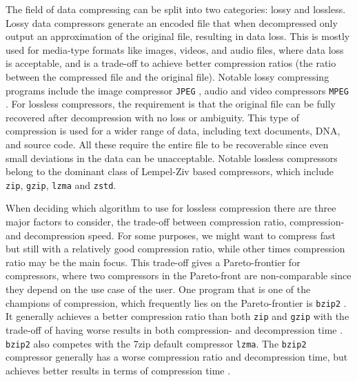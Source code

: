 \documentclass{article}
\begin{document}
The field of data compressing can be split into two categories: lossy and lossless. Lossy data compressors generate an encoded file that when decompressed only output an approximation of the original file, resulting in data loss. This is mostly used for media-type formats like images, videos, and audio files, where data loss is acceptable, and is a trade-off to achieve better compression ratios (the ratio between the compressed file and the original file). %
Notable lossy compressing programs include the image compressor \texttt{JPEG} \cite{jpeg1}, audio and video compressors \texttt{MPEG} \cite{mpeg1}\cite{mpeg2}.
For lossless compressors, the requirement is that the original file can be fully recovered after decompression with no loss or ambiguity. This type of compression is used for a wider range of data, including text documents, DNA, and source code. All these require the entire file to be recoverable since even small deviations in the data can be unacceptable.
Notable lossless compressors belong to the dominant class of Lempel-Ziv \cite{ziv1977universal} based compressors, which include \texttt{zip}, \texttt{gzip}, \texttt{lzma} \cite{lzmaformat} and \texttt{zstd}. %


When deciding which algorithm to use for lossless compression there are three major factors to consider, the trade-off between compression ratio, compression- and decompression speed. %
For some purposes, we might want to compress fast but still with a relatively good compression ratio, while other times compression ratio may be the main focus. This trade-off gives a Pareto-frontier for compressors, where two compressors in the Pareto-front are non-comparable since they depend on the use case of the user.
One program that is one of the champions of compression, which frequently lies on the Pareto-frontier is \texttt{bzip2} \cite{bzip2homepage} \cite{bzip2gitlab} \cite{bzip2formatspecification}. It generally achieves a better compression ratio than both \texttt{zip} and \texttt{gzip} with the trade-off of having worse results in both compression- and decompression time \cite{gzipzipbzip2}. \texttt{bzip2} also competes with the 7zip default compressor \texttt{lzma}. The \texttt{bzip2} compressor generally has a worse compression ratio and decompression time, but achieves better results in terms of compression time \cite{gzipbzip2lzma}.
\end{document}
